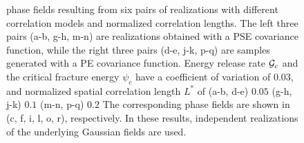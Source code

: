 \begin{figure}[!htbp]
\begin{subfigure}[b]{0.15\textwidth}
    \caption{}
    \label{fig: Chapter4/2D/d_exp_cartesian_20_20_rho_0_seed_b}
  \end{subfigure}
  \caption{phase fields resulting from six pairs of realizations with different correlation models and normalized correlation lengths. The left three pairs (a-b, g-h, m-n) are realizations obtained with a PSE covariance function, while the right three pairs (d-e, j-k, p-q) are samples generated with a PE covariance function. Energy release rate ${\mathcal{G}_c}$ and the critical fracture energy $\psi_c$ have a coefficient of variation of $0.03$, and normalized spatial correlation length $L^*$ of (a-b, d-e) $0.05$ (g-h, j-k) $0.1$ (m-n, p-q) $0.2$ The corresponding phase fields are shown in (c, f, i, l, o, r), respectively. In these results, independent realizations of the underlying Gaussian fields are used.}
  \label{fig: Chapter4/2D/compare_correlation_length}
\end{figure}
